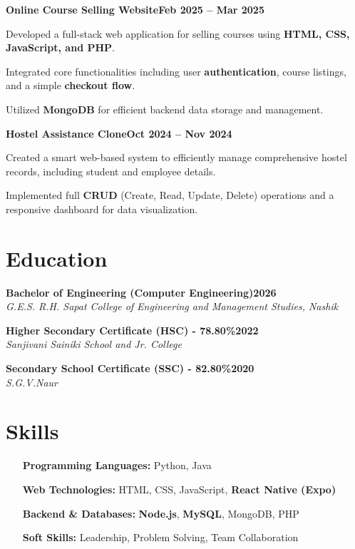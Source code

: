 \documentclass[letterpaper,10pt]{article}
\newcommand{\heading}[2]{
  \hspace{10pt}#1\hfill#2\\
}
\newcommand{\headingBf}[2]{
  \heading{\textbf{#1}}{\textbf{#2}}
}
\newcommand{\headingIt}[2]{
  \heading{\textit{#1}}{\textit{#2}}
}
\newenvironment{resume_list}{
  \vspace{-7pt}
  \begin{itemize}[itemsep=-2px, parsep=1pt, leftmargin=30pt]
}{
  \end{itemize}
}
\begin{document}
\headingBf{Online Course Selling Website}{Feb 2025 -- Mar 2025}
\begin{resume_list}
  \item Developed a full-stack web application for selling courses using \textbf{HTML, CSS, JavaScript, and PHP}.
  \item Integrated core functionalities including user \textbf{authentication}, course listings, and a simple \textbf{checkout flow}.
  \item Utilized \textbf{MongoDB} for efficient backend data storage and management.
\end{resume_list}

\headingBf{Hostel Assistance Clone}{Oct 2024 -- Nov 2024}
\begin{resume_list}
  \item Created a smart web-based system to efficiently manage comprehensive hostel records, including student and employee details.
  \item Implemented full \textbf{CRUD} (Create, Read, Update, Delete) operations and a responsive dashboard for data visualization.
\end{resume_list}

\vspace{10pt}
\section{Education}

\headingBf{Bachelor of Engineering (Computer Engineering)}{2026}
\headingIt{G.E.S. R.H. Sapat College of Engineering and Management Studies, Nashik}{}

\vspace{5pt}
\headingBf{Higher Secondary Certificate (HSC) - 78.80\%}{2022}
\headingIt{Sanjivani Sainiki School and Jr. College}{}

\vspace{5pt}
\headingBf{Secondary School Certificate (SSC) - 82.80\%}{2020}
\headingIt{S.G.V.Naur}{}


\vspace{10pt}
\section{Skills}

\begin{itemize}[itemsep=-2px, parsep=1pt, leftmargin=130pt]
  \item[\textbf{Programming Languages:}] Python, Java
  \vspace{5pt}
  \item[\textbf{Web Technologies:}] HTML, CSS, JavaScript, \textbf{React Native (Expo)}
  \vspace{5pt}
  \item[\textbf{Backend \& Databases:}] \textbf{Node.js}, \textbf{MySQL}, MongoDB, PHP
  \vspace{5pt}
  \item[\textbf{Soft Skills:}] Leadership, Problem Solving, Team Collaboration
\end{itemize}
\end{document}

